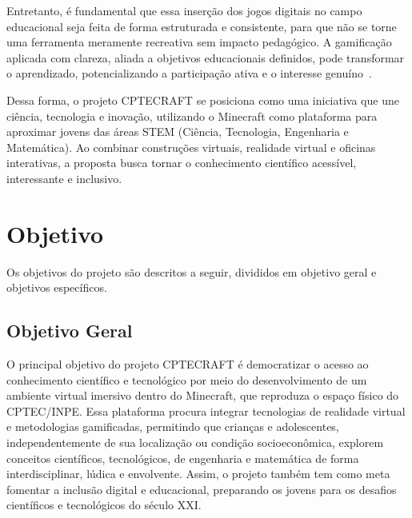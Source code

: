 Entretanto, é fundamental que essa inserção dos jogos digitais no campo educacional seja feita de forma estruturada e consistente, para que não se torne uma ferramenta meramente recreativa sem impacto pedagógico. A gamificação aplicada com clareza, aliada a objetivos educacionais definidos, pode transformar o aprendizado, potencializando a participação ativa e o interesse genuíno~\cite{santos2022}.

Dessa forma, o projeto CPTECRAFT se posiciona como uma iniciativa que une ciência, tecnologia e inovação, utilizando o Minecraft como plataforma para aproximar jovens das áreas STEM (Ciência, Tecnologia, Engenharia e Matemática). Ao combinar construções virtuais, realidade virtual e oficinas interativas, a proposta busca tornar o conhecimento científico acessível, interessante e inclusivo.

\section{Objetivo}

Os objetivos do projeto são descritos a seguir, divididos em objetivo geral e objetivos específicos.

\subsection{Objetivo Geral}
O principal objetivo do projeto CPTECRAFT é democratizar o acesso ao conhecimento científico e tecnológico por meio do desenvolvimento de um ambiente virtual imersivo dentro do Minecraft, que reproduza o espaço físico do CPTEC/INPE. Essa plataforma procura integrar tecnologias de realidade virtual e metodologias gamificadas, permitindo que crianças e adolescentes, independentemente de sua localização ou condição socioeconômica, explorem conceitos científicos, tecnológicos, de engenharia e matemática de forma interdisciplinar, lúdica e envolvente. Assim, o projeto também tem como meta fomentar a inclusão digital e educacional, preparando os jovens para os desafios científicos e tecnológicos do século XXI.

